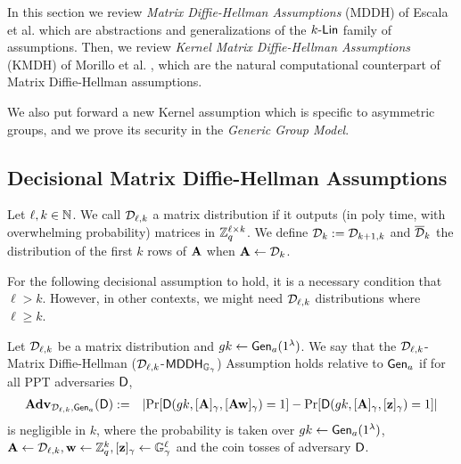 In this section we review \emph{Matrix Diffie-Hellman Assumptions} (MDDH) of Escala et al. \cite{C:EHKRV13} which are abstractions and generalizations of the $k\mbox{-}\mathsf{Lin}$ family of assumptions. Then, we review \emph{Kernel Matrix Diffie-Hellman Assumptions} (KMDH) of Morillo et al. \cite{EPRINT:MorRafVil15}, which are the natural computational counterpart of Matrix Diffie-Hellman assumptions.

We also put forward a new Kernel assumption which is specific to asymmetric groups, and we prove its security in the \emph{Generic Group Model}.

\subsection{Decisional Matrix Diffie-Hellman Assumptions}
\begin{definition}   \label{def:matrixdef}
Let $\ell,k \in \mathbb{N}$.
We call $\mathcal{D}_{\ell,k}$ a matrix distribution if it outputs (in poly time, with overwhelming probability) matrices in $\mathbb{Z}_q^{\ell \times k}$. We define $\mathcal{D}_k := \mathcal{D}_{k+1,k}$ and $\overline{\mathcal{D}}_{k}$ the distribution of the first $k$ rows of $\mathbf{{A}}$ when $\mathbf{{A}}\gets\mathcal{D}_{k}$. 
\end{definition}

For the following decisional assumption to hold, it is a necessary condition that $\ell>k$. However, in other contexts, we might need $\mathcal{D}_{\ell,k}$ distributions where 
$\ell \geq k$. 

\begin{definition}\label{def:mdh}
Let $\mathcal{D}_{\ell,k}$ be a matrix distribution  and ${gk}\gets \mathsf{Gen}_a(1^\lambda)$. We say that the $\mathcal{D}_{\ell,k}$-Matrix Diffie-Hellman ($\mathcal{D}_{\ell,k}$-$\mathsf{MDDH}_{\mathbb{G}_\gamma}$)
Assumption holds relative to $\mathsf{Gen}_a$ if for all PPT adversaries $\mathsf{D}$,
\begin{eqnarray*}
\mathbf{Adv}_{\mathcal{D}_{\ell,k},\mathsf{Gen}_a}(\mathsf{D}) & := &
    \left|
        \Pr[\mathsf{D}({gk},[\mathbf{{A}}]_\gamma,[\mathbf{{A}}\mathbf{w}]_\gamma)=1]-
        \Pr[\mathsf{D}({gk},[\mathbf{{A}}]_\gamma, [\mathbf{z}]_\gamma) =1]
    \right|
\end{eqnarray*}
is negligible in $k$,
where the probability is taken over ${gk} \gets \mathsf{Gen}_a(1^\lambda)$, $\mathbf{{A}} \gets \mathcal{D}_{\ell,k}, \mathbf{w} \gets \mathbb{Z}_q^k, [\mathbf{z}]_\gamma  \gets \mathbb{G}_\gamma^{\ell}$ and the coin tosses of adversary $\mathsf{D}$.
\end{definition}
 
